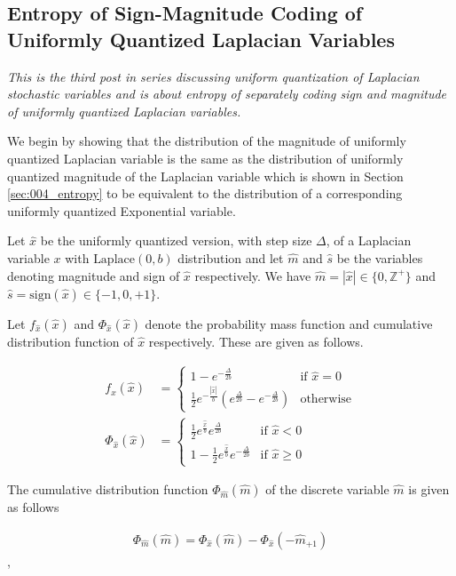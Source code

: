 \subsection{Entropy of Sign-Magnitude Coding of Uniformly Quantized Laplacian Variables}

\emph{This is the third post in series discussing uniform quantization of Laplacian stochastic variables and is about entropy of separately coding sign and magnitude of uniformly quantized Laplacian variables.}

We begin by showing that the distribution of the magnitude of uniformly quantized Laplacian variable is the same as the distribution of uniformly quantized magnitude of the Laplacian variable which is shown in  Section \ref{sec:004_entropy} to be equivalent to the distribution of a corresponding uniformly quantized Exponential variable.

Let $\hat{x}$ be the uniformly quantized version, with step size $\Delta$, of a Laplacian variable $x$ with $\text{Laplace}(0,b)$ distribution and let $\hat{m}$ and $\hat{s}$ be the variables denoting magnitude and sign of $\hat{x}$ respectively. We have $\hat{m} = |\hat{x}| \in \{0, \mathbb{Z}^+\}$ and $\hat{s} = \text{sign}(\hat{x}) \in \{-1, 0, +1\}$.

Let $f_{\hat{x}}(\hat{x})$ and $\Phi_{\hat{x}}(\hat{x})$ denote the probability mass function and cumulative distribution function of $\hat{x}$ respectively. These are given as follows.

\begin{align}f_{\hat{x}}(\hat{x}) &= \begin{cases}1-e^{-\frac{\Delta}{2b}} & \text{if $\hat{x} = 0$}\\ \frac{1}{2}e^{-\frac{|\hat{x}|}{b}}\left(e^{\frac{\Delta}{2b}} - e^{-\frac{\Delta}{2b}}\right) & \text{otherwise}\end{cases}\\\Phi_{\hat{x}}(\hat{x}) &= \begin{cases}\frac{1}{2}e^{\frac{\hat{x}}{b}}e^{\frac{\Delta}{2b}} & \text{if $\hat{x} < 0$}\\1-\frac{1}{2}e^{\frac{\hat{x}}{b}}e^{-\frac{\Delta}{2b}} & \text{if $\hat{x} \geq 0$}\end{cases}\end{align}

The cumulative distribution function $\Phi_{\hat{m}}(\hat{m})$ of the discrete variable $\hat{m}$ is given as follows

\begin{align}\Phi_{\hat{m}}(\hat{m}) = \Phi_{\hat{x}}(\hat{m}) - \Phi_{\hat{x}}(-\hat{m}_{+1})\end{align},

